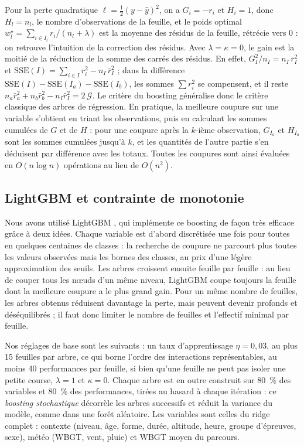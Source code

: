 \documentclass[11pt,a4paper]{article}
\begin{document}
Pour la perte quadratique $\ell = \frac12(y - \hat y)^2$, on a $G_i = -r_i$ et $H_i = 1$, donc $H_l = n_l$, le nombre
d'observations de la feuille, et le poids optimal $w_l^\star = \sum_{i \in I_l} r_i/(n_l + \lambda)$ est la moyenne des
résidus de la feuille, rétrécie vers 0 : on retrouve l'intuition de la correction des résidus. Avec
$\lambda = \kappa = 0$, le gain est la moitié de la réduction de la somme des carrés des résidus. En effet,
$G_I^2/n_I = n_I\,\bar r_I^2$ et $\mathrm{SSE}(I) = \sum_{i \in I} r_i^2 - n_I\,\bar r_I^2$ ; dans la différence
$\mathrm{SSE}(I) - \mathrm{SSE}(I_a) - \mathrm{SSE}(I_b)$, les sommes $\sum r_i^2$ se compensent, et il reste
$n_a \bar r_a^2 + n_b \bar r_b^2 - n_I \bar r_I^2 = 2\,\mathcal G$. Le critère du boosting généralise donc le critère
classique des arbres de régression. En pratique, la meilleure coupure sur une variable s'obtient en triant les
observations, puis en calculant les sommes cumulées de $G$ et de $H$ : pour une coupure après la $k$-ième observation,
$G_{I_a}$ et $H_{I_a}$ sont les sommes cumulées jusqu'à $k$, et les quantités de l'autre partie s'en déduisent par
différence avec les totaux. Toutes les coupures sont ainsi évaluées en $O(n \log n)$ opérations au lieu de
$O(n^2)$.

\subsection{LightGBM et contrainte de monotonie}\label{sec:monotonie}

Nous avons utilisé LightGBM \citep{ke2017}, qui implémente ce boosting de façon très efficace grâce à deux idées.
Chaque variable est d'abord discrétisée une fois pour toutes en quelques centaines de classes : la recherche de
coupure ne parcourt plus toutes les valeurs observées mais les bornes des classes, au prix d'une légère approximation
des seuils. Les arbres croissent ensuite feuille par feuille : au lieu de couper tous les nœuds d'un même niveau,
LightGBM coupe toujours la feuille dont la meilleure coupure a le plus grand gain. Pour un même nombre de feuilles,
les arbres obtenus réduisent davantage la perte, mais peuvent devenir profonds et déséquilibrés ; il faut donc limiter
le nombre de feuilles et l'effectif minimal par feuille.

Nos réglages de base sont les suivants : un taux d'apprentissage $\eta = 0{,}03$, au plus 15 feuilles par arbre, ce
qui borne l'ordre des interactions représentables, au moins 40 performances par feuille, si bien qu'une feuille ne
peut pas isoler une petite course, $\lambda = 1$ et $\kappa = 0$. Chaque arbre est en outre construit sur 80~\% des
variables et 80~\% des performances, tirées au hasard à chaque itération : ce \emph{boosting stochastique} décorrèle
les arbres successifs et réduit la variance du modèle, comme dans une forêt aléatoire. Les variables sont celles du
ridge complet : contexte (niveau, âge, forme, durée, altitude, heure, groupe d'épreuves, sexe), météo (WBGT, vent,
pluie) et WBGT moyen du parcours.
\end{document}
